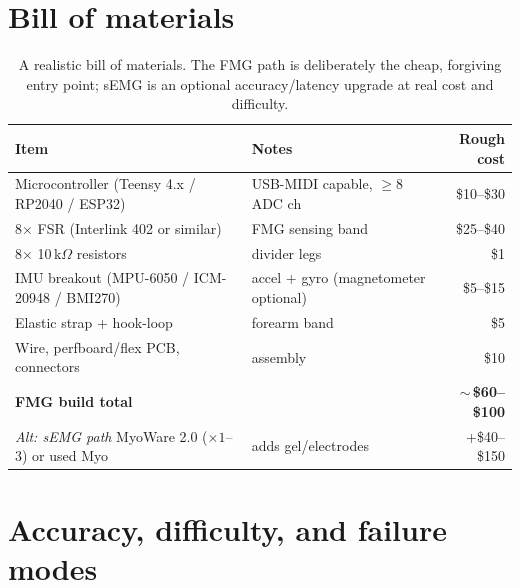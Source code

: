 \section{Bill of materials}
\label{ch41:bom}

\begin{table}[H]
\centering
\small
\begin{tabular}{@{}llr@{}}
\toprule
Item & Notes & Rough cost \\
\midrule
Microcontroller (Teensy 4.x / RP2040 / ESP32) & USB-MIDI capable, $\ge 8$ ADC ch & \$10--\$30 \\
8$\times$ FSR (Interlink 402 or similar) & FMG sensing band & \$25--\$40 \\
8$\times$ 10\,k$\Omega$ resistors & divider legs & \$1 \\
IMU breakout (MPU-6050 / ICM-20948 / BMI270) & accel + gyro (magnetometer optional) & \$5--\$15 \\
Elastic strap + hook-loop & forearm band & \$5 \\
Wire, perfboard/flex PCB, connectors & assembly & \$10 \\
\midrule
\textbf{FMG build total} & & \textbf{$\sim$\,\$60--\$100} \\
\midrule
\emph{Alt: sEMG path} MyoWare 2.0 ($\times 1$--$3$) or used Myo & adds gel/electrodes & +\$40--\$150 \\
\bottomrule
\end{tabular}
\caption{A realistic bill of materials. The FMG path is deliberately the cheap,
forgiving entry point; sEMG is an optional accuracy/latency upgrade at real
cost and difficulty.}
\label{ch41:tab-bom}
\end{table}

\section{Accuracy, difficulty, and failure modes}
\label{ch41:recal}


